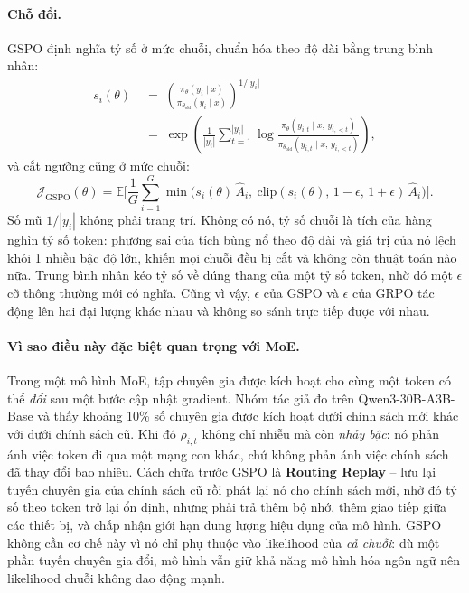 \paragraph{Chỗ đổi.}
GSPO định nghĩa tỷ số ở mức chuỗi, chuẩn hóa theo độ dài bằng trung bình nhân:
\[
\begin{aligned}
s_i(\theta) &\;=\; \left(\frac{\pi_\theta(y_i\mid x)}{\pi_{\theta_{\mathrm{old}}}(y_i\mid x)}\right)^{1/|y_i|}\\[4pt]
&\;=\; \exp\!\left(\frac{1}{|y_i|}\sum_{t=1}^{|y_i|}\log\frac{\pi_\theta(y_{i,t}\mid x,\, y_{i,<t})}{\pi_{\theta_{\mathrm{old}}}(y_{i,t}\mid x,\, y_{i,<t})}\right),
\end{aligned}
\]
và cắt ngưỡng cũng ở mức chuỗi:
\[
\mathcal{J}_{\mathrm{GSPO}}(\theta) = \mathbb{E}\Big[\frac{1}{G}\sum_{i=1}^{G}
\min\big(s_i(\theta)\,\hat{A}_i,\ \mathrm{clip}(s_i(\theta),\,1-\epsilon,\,1+\epsilon)\,\hat{A}_i\big)\Big].
\]
Số mũ $1/|y_i|$ không phải trang trí. Không có nó, tỷ số chuỗi là tích của hàng nghìn tỷ số token: phương sai của tích bùng nổ theo độ dài và giá trị của nó lệch khỏi 1 nhiều bậc độ lớn, khiến mọi chuỗi đều bị cắt và không còn thuật toán nào nữa. Trung bình nhân kéo tỷ số về đúng thang của một tỷ số token, nhờ đó một $\epsilon$ cỡ thông thường mới có nghĩa. Cũng vì vậy, $\epsilon$ của GSPO và $\epsilon$ của GRPO tác động lên hai đại lượng khác nhau và không so sánh trực tiếp được với nhau.

\paragraph{Vì sao điều này đặc biệt quan trọng với MoE.}
Trong một mô hình MoE, tập chuyên gia được kích hoạt cho cùng một token có thể \emph{đổi} sau một bước cập nhật gradient. Nhóm tác giả đo trên Qwen3-30B-A3B-Base và thấy khoảng 10\% số chuyên gia được kích hoạt dưới chính sách mới khác với dưới chính sách cũ. Khi đó $\rho_{i,t}$ không chỉ nhiễu mà còn \emph{nhảy bậc}: nó phản ánh việc token đi qua một mạng con khác, chứ không phản ánh việc chính sách đã thay đổi bao nhiêu. Cách chữa trước GSPO là \textbf{Routing Replay} -- lưu lại tuyến chuyên gia của chính sách cũ rồi phát lại nó cho chính sách mới, nhờ đó tỷ số theo token trở lại ổn định, nhưng phải trả thêm bộ nhớ, thêm giao tiếp giữa các thiết bị, và chấp nhận giới hạn dung lượng hiệu dụng của mô hình. GSPO không cần cơ chế này vì nó chỉ phụ thuộc vào likelihood của \emph{cả chuỗi}: dù một phần tuyến chuyên gia đổi, mô hình vẫn giữ khả năng mô hình hóa ngôn ngữ nên likelihood chuỗi không dao động mạnh.

